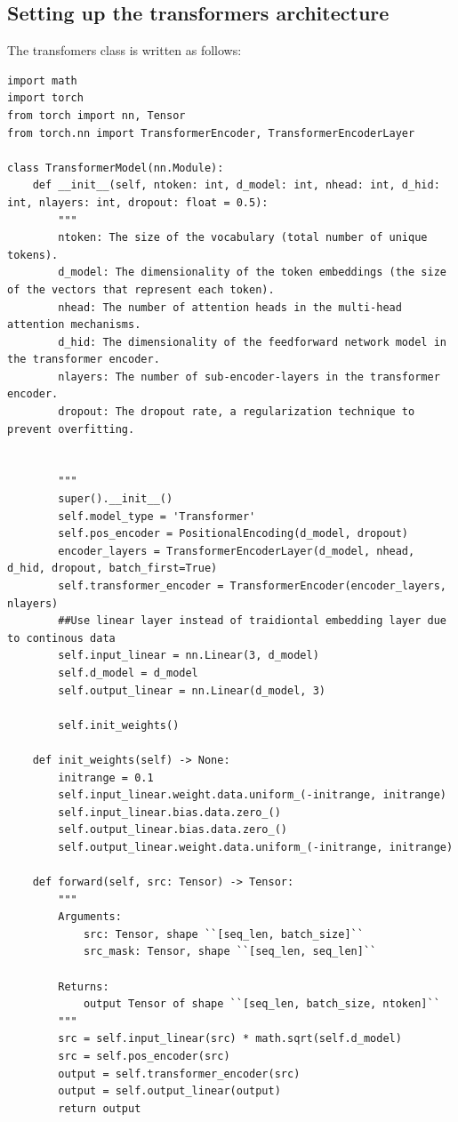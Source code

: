 \documentclass[11pt]{article}
\begin{document}
\subsection{Setting up the transformers architecture}

The transfomers class is written as follows:

\begin{lstlisting}
import math
import torch
from torch import nn, Tensor
from torch.nn import TransformerEncoder, TransformerEncoderLayer

class TransformerModel(nn.Module):
    def __init__(self, ntoken: int, d_model: int, nhead: int, d_hid: int, nlayers: int, dropout: float = 0.5):
        """
        ntoken: The size of the vocabulary (total number of unique tokens).
        d_model: The dimensionality of the token embeddings (the size of the vectors that represent each token).
        nhead: The number of attention heads in the multi-head attention mechanisms.
        d_hid: The dimensionality of the feedforward network model in the transformer encoder.
        nlayers: The number of sub-encoder-layers in the transformer encoder.
        dropout: The dropout rate, a regularization technique to prevent overfitting.


        """
        super().__init__()
        self.model_type = 'Transformer'
        self.pos_encoder = PositionalEncoding(d_model, dropout)
        encoder_layers = TransformerEncoderLayer(d_model, nhead, d_hid, dropout, batch_first=True)
        self.transformer_encoder = TransformerEncoder(encoder_layers, nlayers)
        ##Use linear layer instead of traidiontal embedding layer due to continous data
        self.input_linear = nn.Linear(3, d_model)
        self.d_model = d_model
        self.output_linear = nn.Linear(d_model, 3)

        self.init_weights()

    def init_weights(self) -> None:
        initrange = 0.1
        self.input_linear.weight.data.uniform_(-initrange, initrange)
        self.input_linear.bias.data.zero_()
        self.output_linear.bias.data.zero_()
        self.output_linear.weight.data.uniform_(-initrange, initrange)

    def forward(self, src: Tensor) -> Tensor:
        """
        Arguments:
            src: Tensor, shape ``[seq_len, batch_size]``
            src_mask: Tensor, shape ``[seq_len, seq_len]``

        Returns:
            output Tensor of shape ``[seq_len, batch_size, ntoken]``
        """
        src = self.input_linear(src) * math.sqrt(self.d_model)
        src = self.pos_encoder(src)
        output = self.transformer_encoder(src)
        output = self.output_linear(output)
        return output
    
\end{lstlisting}
\end{document}

